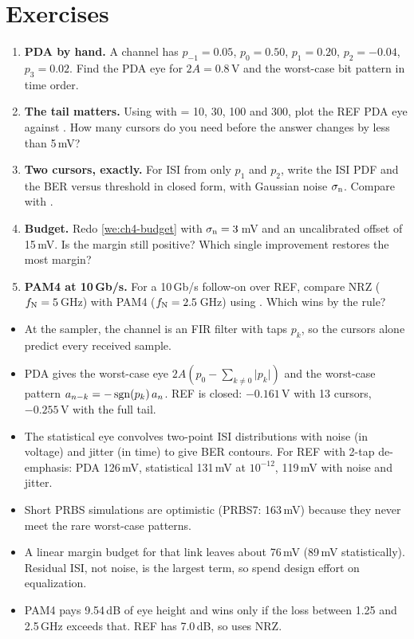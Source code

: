 \section{Exercises}\label{sec:ch4-exercises}
\begin{enumerate}[label=\textbf{4.\arabic*},leftmargin=2.2em]
  \item \textbf{PDA by hand.} A channel has $p_{-1} = 0.05$, $p_0 = 0.50$, $p_1 = 0.20$, $p_2 = -0.04$, $p_3 = 0.02$. Find the PDA eye for $2A = 0.8$\,V and the worst-case bit pattern in time order.
  \item \textbf{The tail matters.} Using  with  = 10, 30, 100 and 300, plot the REF PDA eye against . How many cursors do you need before the answer changes by less than 5\,mV?
  \item \textbf{Two cursors, exactly.} For ISI from only $p_1$ and $p_2$, write the ISI PDF and the BER versus threshold in closed form, with Gaussian noise $\sigma_\mathrm{n}$. Compare with .
  \item \textbf{Budget.} Redo \cref{we:ch4-budget} with $\sigma_\mathrm{n} = 3$\,mV and an uncalibrated offset of 15\,mV. Is the margin still positive? Which single improvement restores the most margin?
  \item \textbf{PAM4 at 10\,Gb/s.} For a 10\,Gb/s follow-on over REF, compare NRZ ($f_\mathrm{N} = 5$\,GHz) with PAM4 ($f_\mathrm{N} = 2.5$\,GHz) using . Which wins by the rule?
\end{enumerate}

\begin{takeaways}
\begin{itemize}
  \item At the sampler, the channel is an FIR filter with taps $p_k$, so the cursors alone predict every received sample.
  \item PDA gives the worst-case eye $2A(p_0 - \sum_{k\neq0}\lvert p_k\rvert)$ and the worst-case pattern $a_{n-k} = -\operatorname{sgn}(p_k)\,a_n$. REF is closed: $-0.161$\,V with 13 cursors, $-0.255$\,V with the full tail.
  \item The statistical eye convolves two-point ISI distributions with noise (in voltage) and jitter (in time) to give BER contours. For REF with 2-tap de-emphasis: PDA 126\,mV, statistical 131\,mV at $10^{-12}$, 119\,mV with noise and jitter.
  \item Short PRBS simulations are optimistic (PRBS7: 163\,mV) because they never meet the rare worst-case patterns.
  \item A linear margin budget for that link leaves about 76\,mV (89\,mV statistically). Residual ISI, not noise, is the largest term, so spend design effort on equalization.
  \item PAM4 pays 9.54\,dB of eye height and wins only if the loss between 1.25 and 2.5\,GHz exceeds that. REF has 7.0\,dB, so \OS{} uses NRZ.
\end{itemize}
\end{takeaways}
